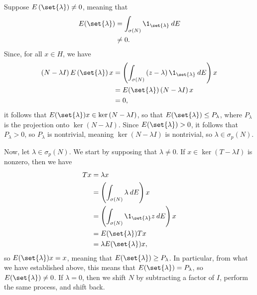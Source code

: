\documentclass[10pt]{mypackage}
\begin{document}
\begin{solution}
  Suppose $E\left(\set{\lambda}\right)\neq 0$, meaning that
  \begin{align*}
    E(\set{\lambda}) &= \int_{\sigma(N)}^{} \1_{\set{\lambda}}\:dE\\
                     &\neq 0.
  \end{align*}
  Since, for all $x\in H$, we have
  \begin{align*}
    \left( N-\lambda I \right)E\left(\set{\lambda}\right) x &= \left( \int_{\sigma(N)}^{} \left( z-\lambda \right)\1_{\set{\lambda}}\:dE \right)x\\
                                                            &= E(\set{\lambda}) \left( N-\lambda I \right) x\\
                                                            &= 0,
  \end{align*}
  it follows that $E(\set{\lambda}) x\in \ker\left( N-\lambda I \right)$, so that $E(\set{\lambda})\leq P_{\lambda}$, where $P_{\lambda}$ is the projection onto $\ker\left( N-\lambda I \right)$. Since $E(\set{\lambda}) > 0$, it follows that $P_{\lambda} > 0$, so $P_{\lambda}$ is nontrivial, meaning $\ker\left( N-\lambda I \right)$ is nontrivial, so $\lambda\in \sigma_p(N)$.

  Now, let $\lambda\in \sigma_p(N)$. We start by supposing that $\lambda\neq 0$. If $x\in \ker\left( T-\lambda I \right)$ is nonzero, then we have
  \begin{align*}
    Tx &= \lambda x\\
       &= \left( \int_{\sigma(N)}^{} \lambda\:dE \right)x\\
       &= \left( \int_{\sigma(N)}^{} \1_{\set{\lambda}}z\:dE \right)x\\
       &= E(\set{\lambda}) Tx\\
       &= \lambda E(\set{\lambda})x,
  \end{align*}
  so $E(\set{\lambda})x = x$, meaning that $E(\set{\lambda}) \geq P_{\lambda}$. In particular, from what we have established above, this means that $E(\set{\lambda}) = P_{\lambda}$, so $E(\set{\lambda})\neq 0$. If $\lambda = 0$, then we shift $N$ by subtracting a factor of $I$, perform the same process, and shift back.
\end{solution}
\end{document}
